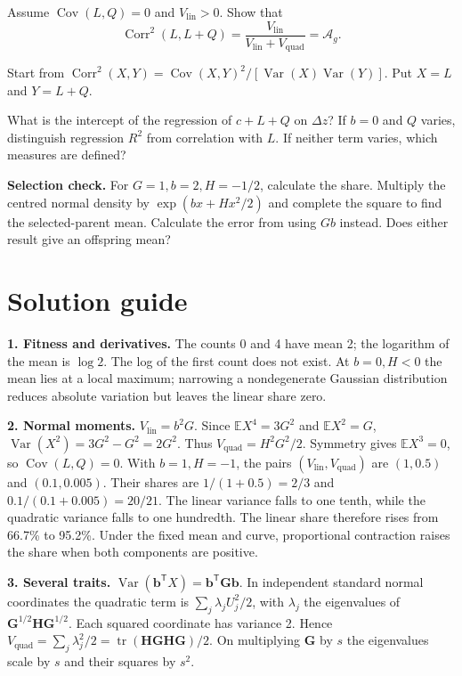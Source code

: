 \documentclass[11pt]{article}
\newcommand{\G}{\mathbf G}
\newcommand{\bvec}{\mathbf b}
\newcommand{\Hess}{\mathbf H}
\newcommand{\E}{\mathbb E}
\newcommand{\Ag}{\mathcal A_g}
\newcommand{\Vlin}{V_{\mathrm{lin}}}
\newcommand{\Vquad}{V_{\mathrm{quad}}}
\newcommand{\tr}{\operatorname{tr}}
\newcommand{\Var}{\operatorname{Var}}
\newcommand{\Cov}{\operatorname{Cov}}
\begin{document}
Assume $\Cov(L,Q)=0$ and $\Vlin>0$. Show that
\begin{equation}
\operatorname{Corr}^2(L,L+Q)=\frac{\Vlin}{\Vlin+\Vquad}=\Ag.
\end{equation}

\begin{hintbox}
Start from \(\operatorname{Corr}^2(X,Y)=\Cov(X,Y)^2/[\Var(X)\Var(Y)]\). Put \(X=L\) and \(Y=L+Q\).
\end{hintbox}

What is the intercept of the regression of $c+L+Q$ on $\Delta z$? If $b=0$ and $Q$ varies, distinguish regression $R^2$ from correlation with $L$. If neither term varies, which measures are defined?

\textbf{Selection check.} For $G=1,b=2,H=-1/2$, calculate the share. Multiply the centred normal density by $\exp(bx+Hx^2/2)$ and complete the square to find the selected-parent mean. Calculate the error from using $Gb$ instead. Does either result give an offspring mean?

\clearpage
\section*{Solution guide}


\textbf{1. Fitness and derivatives.} The counts 0 and 4 have mean 2; the logarithm of the mean is $\log 2$. The log of the first count does not exist. At $b=0,H<0$ the mean lies at a local maximum; narrowing a nondegenerate Gaussian distribution reduces absolute variation but leaves the linear share zero.

\textbf{2. Normal moments.} $\Vlin=b^2G$. Since $\E X^4=3G^2$ and $\E X^2=G$, $\Var(X^2)=3G^2-G^2=2G^2$. Thus $\Vquad=H^2G^2/2$. Symmetry gives $\E X^3=0$, so $\Cov(L,Q)=0$. With $b=1,H=-1$, the pairs $(\Vlin,\Vquad)$ are $(1,0.5)$ and $(0.1,0.005)$. Their shares are $1/(1+0.5)=2/3$ and $0.1/(0.1+0.005)=20/21$. The linear variance falls to one tenth, while the quadratic variance falls to one hundredth. The linear share therefore rises from 66.7\% to 95.2\%. Under the fixed mean and curve, proportional contraction raises the share when both components are positive.

\textbf{3. Several traits.} $\Var(\bvec^\mathsf T X)=\bvec^\mathsf T\G\bvec$. In independent standard normal coordinates the quadratic term is $\sum_j\lambda_j U_j^2/2$, with $\lambda_j$ the eigenvalues of $\G^{1/2}\Hess\G^{1/2}$. Each squared coordinate has variance 2. Hence $\Vquad=\sum_j\lambda_j^2/2=\tr(\Hess\G\Hess\G)/2$. On multiplying $\G$ by $s$ the eigenvalues scale by $s$ and their squares by $s^2$.
\end{document}

